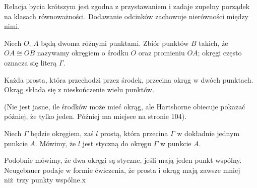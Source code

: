 Relacja bycia krótszym jest zgodna z przystawaniem i zadaje zupełny porządek na klasach równoważności.
Dodawanie odcinków zachowuje nierówności między nimi.

\begin{definition}[okrąg]
    Niech $O$, $A$ będą dwoma różnymi punktami.
    Zbiór punktów $B$ takich, że $OA \cong OB$ nazywamy okręgiem o środku $O$ oraz promieniu $OA$; okręgi często oznacza się literą $\Gamma$.
\end{definition} %

\begin{proposition}
    Każda prosta, która przechodzi przez środek, przecina okrąg w dwóch punktach.
    Okrąg składa się z nieskończenie wielu punktów.
\end{proposition}

(Nie jest jasne, ile środków może mieć okrąg, ale Hartshorne \cite[s. 89]{hartshorne2000} obiecuje pokazać póżniej, że tylko jeden.
%
Później ma miejsce na stronie 104).

\begin{definition}[styczna]
    Niech $\Gamma$ będzie okręgiem, zaś $l$ prostą, która przecina $\Gamma$ w dokładnie jednym punkcie $A$.
    Mówimy, że $l$ jest styczną do okręgu $\Gamma$ w punkcie $A$.
\end{definition}

Podobnie mówimy, że dwa okręgi są styczne, jeśli mają jeden punkt wspólny.
Neugebauer \cite[s. 20]{neugebauer_2018} podaje w formie ćwiczenia, że prosta i okrąg mają zawsze mniej niż trzy punkty wspólne.x

%